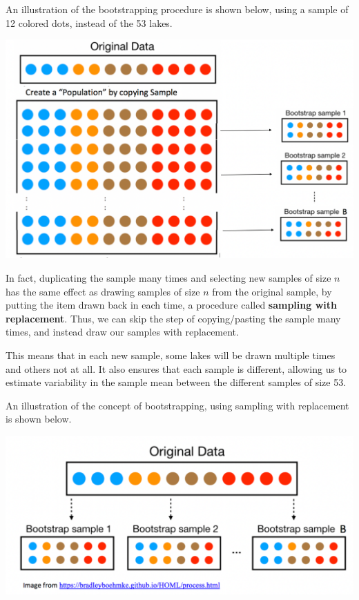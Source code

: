 \documentclass[
  letterpaper,
  DIV=11,
  numbers=noendperiod]{scrreprt}
\begin{document}
An illustration of the bootstrapping procedure is shown below, using a
sample of 12 colored dots, instead of the 53 lakes.

\includegraphics[width=1\textwidth,height=\textheight]{Bootstrap_Idea.png}

In fact, duplicating the sample many times and selecting new samples of
size \(n\) has the same effect as drawing samples of size \(n\) from the
original sample, by putting the item drawn back in each time, a
procedure called \textbf{sampling with replacement}. Thus, we can skip
the step of copying/pasting the sample many times, and instead draw our
samples with replacement.

This means that in each new sample, some lakes will be drawn multiple
times and others not at all. It also ensures that each sample is
different, allowing us to estimate variability in the sample mean
between the different samples of size 53.

An illustration of the concept of bootstrapping, using sampling with
replacement is shown below.

\includegraphics[width=1\textwidth,height=\textheight]{Bootstrap.png}
\end{document}
